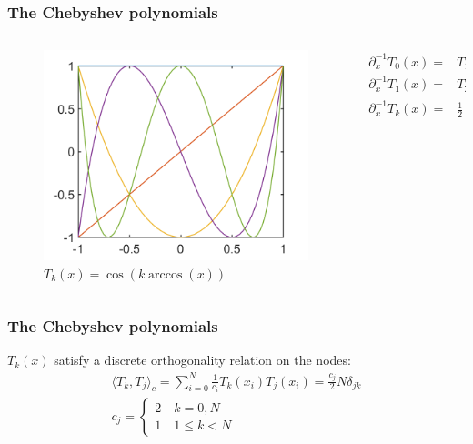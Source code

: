 \documentclass{beamer}
\begin{document}
\begin{frame}
\frametitle{The Chebyshev polynomials}

\begin{columns}

\begin{column}{0.4\textwidth}
\begin{figure}
\includegraphics[width=\textwidth]{ChebPoly.png}
\caption{$T_k(x) = \cos \left ( k \arccos (x) \right )$}
\end{figure}
\end{column}

\begin{column}{0.6\textwidth}
\begin{align*}
 \partial_x^{-1} T_0(x) = & T_1(x) \\
 \partial_x^{-1} T_1(x) = & T_2(x) / 4 \\
 \partial_x^{-1}T_k(x) = & \frac{1}{2} \left ( \frac{T_{k+1}(x)}{k+1} - \frac{T_{k-1}(x)}{k-1} \right ).
\end{align*}
\end{column}

\end{columns}
\end{frame}

\begin{frame}
\frametitle{The Chebyshev polynomials}
$T_k(x)$ satisfy a discrete orthogonality relation on the nodes:
\begin{equation*}
\begin{gathered}
\langle T_k,T_j \rangle_c = 
\sum_{i=0}^{N} \frac{1}{c_i} T_k(x_i) T_j(x_i) = \frac{c_j}{2} N \delta_{jk} \\
c_j = \begin{cases} 2 \quad k = 0, N \\ 1 \quad 1 \leq k < N \end{cases}
\end{gathered}
\end{equation*}
\end{frame}
\end{document}
